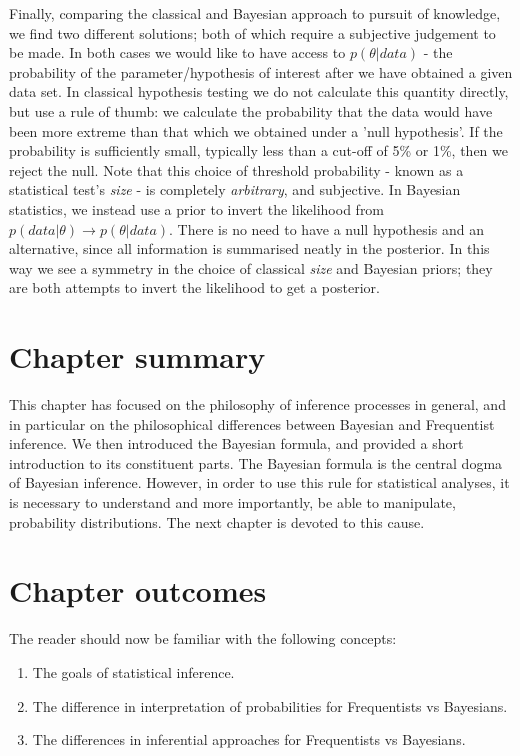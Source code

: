\documentclass[11pt,fullpage]{book}
\begin{document}
Finally, comparing the classical and Bayesian approach to pursuit of knowledge, we find two different solutions; both of which require a subjective judgement to be made. In both cases we would like to have access to $p(\theta|data)$ - the probability of the parameter/hypothesis of interest after we have obtained a given data set. In classical hypothesis testing we do not calculate this quantity directly, but use a rule of thumb: we calculate the probability that the data would have been more extreme than that which we obtained under a 'null hypothesis'. If the probability is sufficiently small, typically less than a cut-off of 5\% or 1\%, then we reject the null. Note that this choice of threshold probability - known as a statistical test's \textit{size} - is completely \textit{arbitrary}, and subjective. In Bayesian statistics, we instead use a prior to invert the likelihood from $p(data|\theta)\rightarrow p(\theta|data)$. There is no need to have a null hypothesis and an alternative, since all information is summarised neatly in the posterior. In this way we see a symmetry in the choice of classical \textit{size} and Bayesian priors; they are both attempts to invert the likelihood to get a posterior. 

\section{Chapter summary}
This chapter has focused on the philosophy of inference processes in general, and in particular on the philosophical differences between Bayesian and Frequentist inference. We then introduced the Bayesian formula, and provided a short introduction to its constituent parts. The Bayesian formula is the central dogma of Bayesian inference. However, in order to use this rule for statistical analyses, it is necessary to understand and more importantly, be able to manipulate, probability distributions. The next chapter is devoted to this cause.

\section{Chapter outcomes}
The reader should now be familiar with the following concepts:

\begin{enumerate}
\item The goals of statistical inference.
\item The difference in interpretation of probabilities for Frequentists vs Bayesians.
\item The differences in inferential approaches for Frequentists vs Bayesians.
\end{enumerate}
\end{document}
